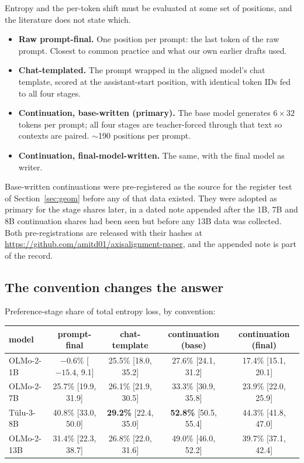 \documentclass[11pt]{article}
\begin{document}
Entropy and the per-token shift must be evaluated at some set of positions, and the
literature does not state which.

\begin{itemize}
\item \textbf{Raw prompt-final.} One position per prompt: the last token of the raw
prompt. Closest to common practice and what our own earlier drafts used.
\item \textbf{Chat-templated.} The prompt wrapped in the aligned model's chat
template, scored at the assistant-start position, with identical token IDs fed to
all four stages.
\item \textbf{Continuation, base-written (primary).} The base model generates
$6\times32$ tokens per prompt; all four stages are teacher-forced through that text
so contexts are paired. $\sim$190 positions per prompt.
\item \textbf{Continuation, final-model-written.} The same, with the final model as
writer.
\end{itemize}

Base-written continuations were pre-registered as the source for the register test
of Section~\ref{sec:geom} before any of that data existed. They were adopted as
primary for the stage shares later, in a dated note appended after the 1B, 7B and
8B continuation shares had been seen but before any 13B data was collected. Both
pre-registrations are released with their hashes at \url{https://github.com/amitd01/axisalignment-paper}, and the appended
note is part of the record.

\subsection{The convention changes the answer}
\label{sec:conv}

Preference-stage share of total entropy loss, by convention:

\begin{center}
\small
\begin{tabular}{lcccc}
\toprule
model & prompt-final & chat-template & continuation (base) & continuation (final) \\
\midrule
OLMo-2-1B & $\mathbf{-0.6\%}$ [$-15.4$, 9.1] & 25.5\% [18.0, 35.2] & 27.6\% [24.1, 31.2] & 17.4\% [15.1, 20.1] \\
OLMo-2-7B & 25.7\% [19.9, 31.9] & 26.1\% [21.9, 30.5] & 33.3\% [30.9, 35.8] & 23.9\% [22.0, 25.9] \\
T\"ulu-3-8B & 40.8\% [33.0, 50.0] & \textbf{29.2\%} [22.4, 35.0] & \textbf{52.8\%} [50.5, 55.4] & 44.3\% [41.8, 47.0] \\
OLMo-2-13B & 31.4\% [22.3, 38.7] & 26.8\% [22.0, 31.6] & 49.0\% [46.0, 52.2] & 39.7\% [37.1, 42.4] \\
\bottomrule
\end{tabular}
\end{center}
\end{document}
